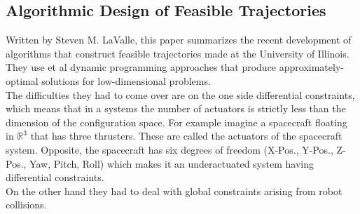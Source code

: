 \documentclass[conference]{IEEEtran}
\begin{document}
\subsection{Algorithmic Design of Feasible Trajectories}
Written by Steven M. LaValle, this paper summarizes the recent development of algorithms that construct feasible trajectories made at the University of Illinois. They use et al dynamic programming approaches that produce approximately-optimal solutions for low-dimensional problems. \\
The difficulties they had to come over are on the one side differential constraints, which means that in a systems the number of actuators is strictly less than the dimension of the configuration space. For example imagine a spacecraft floating in $\mathbb{R}^3$ that has three thrusters. These are called the actuators of the spacecraft system. Opposite, the spacecraft has six degrees of freedom (X-Pos., Y-Pos., Z-Pos., Yaw, Pitch, Roll) which makes it an underactuated system having differential constraints.\\
On the other hand they had to deal with global constraints arising from robot collisions.\\
\end{document}
